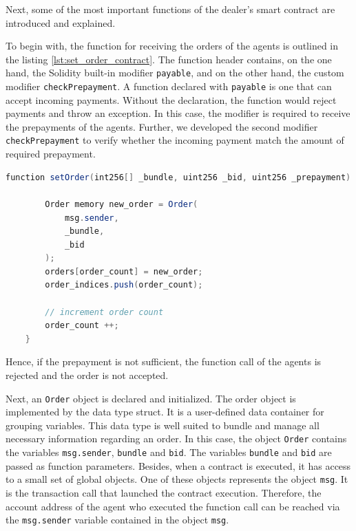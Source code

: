 Next, some of the most important functions of the dealer's smart contract are introduced and explained.

To begin with, the function for receiving the orders of the agents is outlined in the listing \ref{lst:set_order_contract}.
The function header contains, on the one hand, the Solidity built-in modifier \verb|payable|, and on the other hand, the custom
modifier \verb|checkPrepayment|. A function declared with \verb|payable| is one that can accept incoming payments. 
Without the declaration, the function would reject payments and throw an exception. In this case, the modifier is required 
to receive the prepayments of the agents. 
Further, we developed the second modifier \verb|checkPrepayment| to verify whether the incoming payment match the amount
of required prepayment.

\begin{lstlisting}[float=htbp, label=lst:set_order_contract, caption=Receiving agents orders, language=Java]
    function setOrder(int256[] _bundle, uint256 _bid, uint256 _prepayment) public payable checkPrepayment(_prepayment) {

        Order memory new_order = Order(
            msg.sender,
            _bundle,
            _bid
        );
        orders[order_count] = new_order;
        order_indices.push(order_count);

        // increment order count
        order_count ++;
    }
\end{lstlisting}

Hence, if the prepayment is not sufficient, the function call of the agents is rejected and 
the order is not accepted.

Next, an \verb|Order| object is declared and initialized. The order object is implemented by the data type
struct. It is a user-defined data container for grouping variables.
This data type is well suited to bundle and manage all necessary information regarding an order.
In this case, the object \verb|Order| contains the variables \verb|msg.sender|, \verb|bundle| and \verb|bid|.
The variables \verb|bundle| and \verb|bid| are passed as function parameters.
Besides, when a contract is executed, it has access to a small set of global objects. 
One of these objects represents the object \verb|msg|. It is the transaction call that launched the contract execution.
Therefore, the account address of the agent who executed the function call can be reached via the \verb|msg.sender| variable
contained in the object \verb|msg|.

